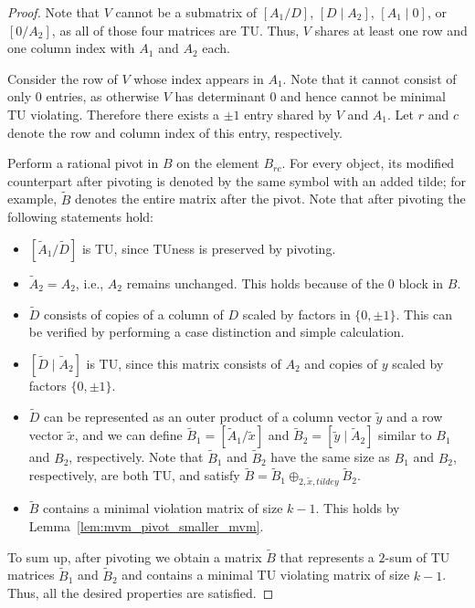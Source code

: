 \documentclass{article}
\theoremstyle{definition}
\begin{document}
\begin{proof}
    Note that $V$ cannot be a submatrix of $\left[A_{1} / D\right]$, $\left[D \mid A_{2}\right]$, $\left[A_{1} \mid 0\right]$, or $\left[0 / A_{2}\right]$, as all of those four matrices are TU. Thus, $V$ shares at least one row and one column index with $A_{1}$ and $A_{2}$ each.

    Consider the row of $V$ whose index appears in $A_{1}$. Note that it cannot consist of only $0$ entries, as otherwise $V$ has determinant $0$ and hence cannot be minimal TU violating. Therefore there exists a $\pm 1$ entry shared by $V$ and $A_{1}$. Let $r$ and $c$ denote the row and column index of this entry, respectively.

    Perform a rational pivot in $B$ on the element $B_{rc}$. For every object, its modified counterpart after pivoting is denoted by the same symbol with an added tilde; for example, $\tilde{B}$ denotes the entire matrix after the pivot. Note that after pivoting the following statements hold:
    \begin{itemize}
        \item $\left[\tilde{A}_{1} / \tilde{D}\right]$ is TU, since TUness is preserved by pivoting.
        \item $\tilde{A}_{2} = A_{2}$, i.e., $A_{2}$ remains unchanged. This holds because of the $0$ block in $B$.
        \item $\tilde{D}$ consists of copies of a column of $D$ scaled by factors in $\{0, \pm 1\}$. This can be verified by performing a case distinction and simple calculation.
        \item $\left[\tilde{D} \mid \tilde{A}_{2}\right]$ is TU, since this matrix consists of $A_{2}$ and copies of $y$ scaled by factors $\{0, \pm 1\}$.
        \item $\tilde{D}$ can be represented as an outer product of a column vector $\tilde{y}$ and a row vector $\tilde{x}$, and we can define $\tilde{B}_{1} = \left[\tilde{A}_{1} / \tilde{x}\right]$ and $\tilde{B}_{2} = \left[\tilde{y} \mid \tilde{A}_{2}\right]$ similar to $B_{1}$ and $B_{2}$, respectively. Note that $\tilde{B}_{1}$ and $\tilde{B}_{2}$ have the same size as $B_{1}$ and $B_{2}$, respectively, are both TU, and satisfy $\tilde{B} = \tilde{B}_{1} \oplus_{2, \tilde{x}, tilde{y}} \tilde{B}_{2}$.
        \item $\tilde{B}$ contains a minimal violation matrix of size $k - 1$. This holds by Lemma~\ref{lem:mvm_pivot_smaller_mvm}.
    \end{itemize}
    To sum up, after pivoting we obtain a matrix $\tilde{B}$ that represents a $2$-sum of TU matrices $\tilde{B}_{1}$ and $\tilde{B}_{2}$ and contains a minimal TU violating matrix of size $k - 1$. Thus, all the desired properties are satisfied.
\end{proof}
\end{document}
